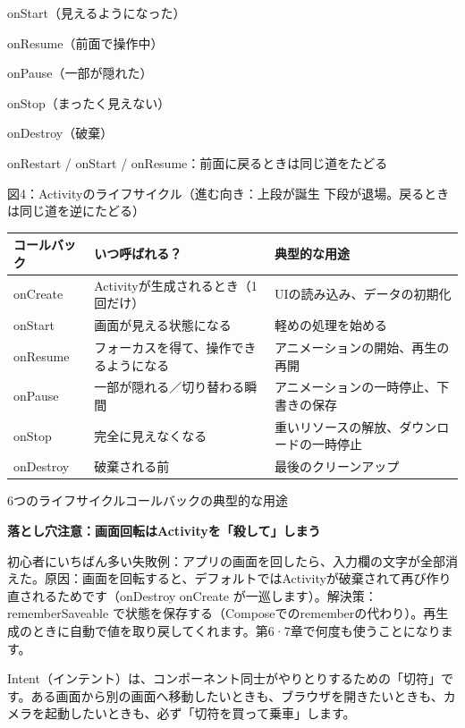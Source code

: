 onStart（見えるようになった）

onResume（前面で操作中）

onPause（一部が隠れた）

onStop（まったく見えない）

onDestroy（破棄）

onRestart / onStart / onResume：前面に戻るときは同じ道をたどる

\begin{center}\small\color{gray}図4：Activityのライフサイクル（進む向き：上段が誕生 下段が退場。戻るときは同じ道を逆にたどる）\end{center}

\begin{center}
\begin{tabularx}{\linewidth}{|X|X|X|}
\hline
\textbf{コールバック} & \textbf{いつ呼ばれる？} & \textbf{典型的な用途} \tabularnewline
\hline
onCreate & Activityが生成されるとき（1回だけ） & UIの読み込み、データの初期化 \tabularnewline
onStart & 画面が見える状態になる & 軽めの処理を始める \tabularnewline
onResume & フォーカスを得て、操作できるようになる & アニメーションの開始、再生の再開 \tabularnewline
onPause & 一部が隠れる／切り替わる瞬間 & アニメーションの一時停止、下書きの保存 \tabularnewline
onStop & 完全に見えなくなる & 重いリソースの解放、ダウンロードの一時停止 \tabularnewline
onDestroy & 破棄される前 & 最後のクリーンアップ \tabularnewline
\hline
\end{tabularx}
\end{center}

\begin{center}\small\color{gray}6つのライフサイクルコールバックの典型的な用途\end{center}

\textbf{落とし穴注意：画面回転はActivityを「殺して」しまう}\par

初心者にいちばん多い失敗例：アプリの画面を回したら、入力欄の文字が全部消えた。原因：画面を回転すると、デフォルトではActivityが破棄されて再び作り直されるためです（onDestroy onCreate が一巡します）。解決策：rememberSaveable で状態を保存する（Composeでのrememberの代わり）。再生成のときに自動で値を取り戻してくれます。第6·7章で何度も使うことになります。


Intent（インテント）は、コンポーネント同士がやりとりするための「切符」です。ある画面から別の画面へ移動したいときも、ブラウザを開きたいときも、カメラを起動したいときも、必ず「切符を買って乗車」します。


